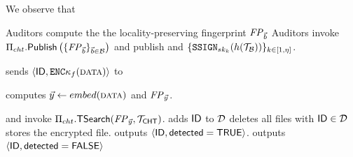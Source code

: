 We observe that 






\begin{algorithm}[t]
\caption{\protocolFM: content moderation with exact matching\label{protocol:fuzzy}}
\footnotesize
\begin{algorithmic}[1]

\Statex{}


\For{$\blocklistVec \in \blocklist$}
\State Auditors compute the the locality-preserving fingerprint $\fingerprint{\blocklistVec}$
\EndFor
\State Auditors invoke $\chtACB.\publishList\left(\{ \fingerprint{\blocklistVec} \}_{\blocklistVec \in \blocklist}\right)$ and publish \chtBlklistToken and $\{\signGenSig[\auditorPrivKeyGenericScheme[\auditorIdx]](\hashFn(\blklistToken))\}_{\auditorIdx \in [1, \numAuditors]}$.

\Statex{}

\State \client sends $\langle \genericFileID, \encrypt{\fileKey}(\clientData) \rangle$ to \server

\State \client computes $\clientVec \assign \embed(\clientData)$ and $\fingerprint{\clientVec}$. 

\State \client and \server invoke $\chtACB.\thresholdSearchBlocklist(\fingerprint{\clientVec}, \chtBlklistToken)$. 
\State \server adds $\mathsf{ID}$ to $\mathcal{D}$
\If{$\setSize{\flagContentList} \ge \flagContentThreshold$}
\State \server deletes all files with $\mathsf{ID} \in \mathcal{D}$ 
\Else 
\State \server stores the encrypted file.
\EndIf
\State \server outputs $\langle \mathsf{ID}, \mathsf{detected}=\mathsf{TRUE}\rangle$. 
\Else 
\State \server outputs $\langle \mathsf{ID}, \mathsf{detected}=\mathsf{FALSE}\rangle$
\EndIf







\end{algorithmic}
\end{algorithm}


